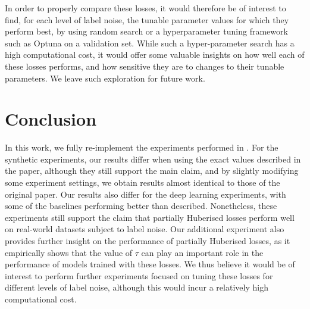 In order to properly compare these losses, it would therefore be of interest to find, for each level of label noise, the tunable parameter values for which they perform best, by using random search or a hyperparameter tuning framework such as Optuna \parencite{akiba2019optuna} on a validation set. While such a hyper-parameter search has a high computational cost, it would offer some valuable insights on how well each of these losses performs, and how sensitive they are to changes to their tunable parameters. We leave such exploration for future work.


\section{Conclusion}
\label{sec:conclusion}

In this work, we fully re-implement the experiments performed in \textcite{menon_can_2019}. For the synthetic experiments, our results differ when using the exact values described in the paper, although they still support the main claim, and by slightly modifying some experiment settings, we obtain results almost identical to those of the original paper. Our results also differ for the deep learning experiments, with some of the baselines performing better than described. Nonetheless, these experiments still support the claim that partially Huberised losses perform well on real-world datasets subject to label noise. Our additional experiment also provides further insight on the performance of partially Huberised losses, as it empirically shows that the value of $\tau$ can play an important role in the performance of models trained with these losses. We thus believe it would be of interest to perform further experiments focused on tuning these losses for different levels of label noise, although this would incur a relatively high computational cost. 
